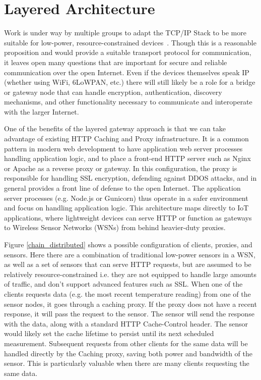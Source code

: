 \documentclass{acm_proc_article-sp}
\begin{document}
\section{Layered Architecture}

Work is under way by multiple groups to adapt the TCP/IP Stack to be more
suitable for low-power, resource-constrained devices~\cite{iotsurvey}. Though
this is a reasonable proposition and would provide a suitable transport
protocol for communication, it leaves open many questions that are important
for secure and reliable communication over the open Internet. Even if the
devices themselves speak IP (whether using WiFi, 6LoWPAN, etc.) there will
still likely be a role for a bridge or gateway node that can handle encryption,
authentication, discovery mechanisms, and other functionality necessary to
communicate and interoperate with the larger Internet.

One of the benefits of the layered gateway approach is that we can take
advantage of existing HTTP Caching and Proxy infrastructure. It is a common
pattern in modern web development to have application web server processes
handling application logic, and to place a front-end HTTP server such as Nginx
or Apache as a reverse proxy or gateway. In this configuration, the proxy is
responsible for handling SSL encryption, defending against DDOS attacks, and in
general provides a front line of defense to the open Internet. The application
server processes (e.g.  Node.js or Gunicorn) thus operate in a safer
environment and focus on handling application logic. This architecture maps
directly to IoT applications, where lightweight devices can serve HTTP or
function as gateways to Wireless Sensor Networks (WSNs) from behind
heavier-duty proxies.

Figure \ref{chain_distributed} shows a possible configuration of clients,
proxies, and sensors. Here there are a combination of traditional low-power
sensors in a WSN, as well as a set of sensors that
can serve HTTP requests, but are assumed to be relatively resource-constrained
i.e.  they are not equipped to handle large amounts of traffic, and don't
support advanced features such as SSL. When one of the clients requests data
(e.g. the most recent temperature reading) from one of the sensor nodes, it
goes through a caching proxy. If the proxy does not have a recent response, it
will pass the request to the sensor. The sensor will send the response with the
data, along with a standard HTTP Cache-Control header. The sensor would likely
set the cache lifetime to persist until its next scheduled measurement.
Subsequent requests from other clients for the same data will be handled
directly by the Caching proxy, saving both power and bandwidth of the sensor.
This is particularly valuable when there are many clients requesting the same
data.
\end{document}
